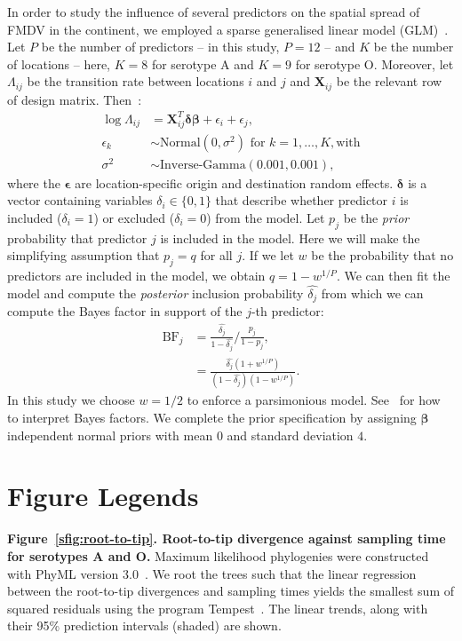 \documentclass[a4paper,10pt]{article}
\begin{document}
In order to study the influence of several predictors on the spatial spread of FMDV in the continent, we employed a sparse generalised linear model (GLM)~\cite{M-Lemey2014,M-Dudas2017}.
Let $P$ be the number of predictors -- in this study, $P = 12$ -- and $K$ be the number of locations -- here, $K = 8$ for serotype A and $K = 9$ for serotype O.
Moreover, let $\Lambda_{ij}$ be the transition rate between locations $i$ and $j$ and $\boldsymbol X_{ij}$ be the relevant row of design matrix.
Then~\citep{M-Dudas2017}:
\begin{align*}
 \log \Lambda_{ij}  &= \boldsymbol X_{ij}^T \boldsymbol\delta \boldsymbol{\beta}
+ \epsilon_i + \epsilon_j, \\
\epsilon_k &\sim \text{Normal}(0, \sigma^2) \text{ for } k = 1, \ldots, K, \text{with} \\
\sigma^2 &\sim \text{Inverse-Gamma}(0.001, 0.001),
\end{align*}
where the $\boldsymbol\epsilon$ are location-specific origin and destination random effects.
$\boldsymbol\delta$ is a vector containing variables $\delta_i \in \{0, 1\}$ that describe whether predictor $i$ is included ($\delta_i = 1$) or excluded ($\delta_i = 0$) from the model.
Let $p_j$ be the \textit{prior} probability that predictor $j$ is included in the model.
Here we will make the simplifying assumption that $p_j = q$ for all $j$.
If we let $w$ be the probability that no predictors are included in the model, we obtain  $q = 1 - w^{1/P}$.
We can then fit the model and compute the \textit{posterior} inclusion probability $\hat{\delta_j}$ from which we can compute the Bayes factor in support of the $j$-th predictor:
\begin{align*}
 \text{BF}_j &= \frac{\hat{\delta_j} }{1-\hat{\delta_j} }/\frac{p_j}{1-p_j}, \\
  &= \frac{\hat{\delta_j} (1 + w^{1/P})}{(1-\hat{\delta_j})(1 - w^{1/P}) }.
\end{align*}
In this study we choose $w = 1/2$ to enforce a parsimonious model.
See~\cite{M-KassRaftery1995} for how to interpret Bayes factors.
We complete the prior specification by assigning $\boldsymbol\beta$ independent normal priors with mean $0$ and standard deviation $4$.



\section*{Figure Legends}

\textbf{Figure~\ref{sfig:root-to-tip}. Root-to-tip divergence against sampling time for serotypes A and O.}
Maximum likelihood phylogenies were constructed with PhyML version 3.0~\cite{M-Guindon2003}. 
We root the trees such that the linear regression between the root-to-tip divergences and sampling times yields the smallest sum of squared residuals using the program Tempest~\citep{M-Rambaut2016}.
The linear trends, along with their 95\% prediction intervals (shaded) are shown.
\end{document}
